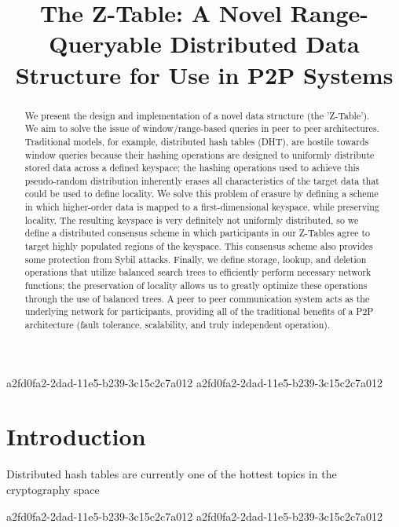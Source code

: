 \documentclass[12pt]{article}
\title{The Z-Table: A Novel Range-Queryable Distributed Data Structure for Use in P2P Systems}
\begin{document}
\maketitle
a2fd0fa2-2dad-11e5-b239-3c15c2c7a012
a2fd0fa2-2dad-11e5-b239-3c15c2c7a012\begin{abstract}
We present the design and implementation of a novel data structure (the 'Z-Table'). We aim to solve the issue of window/range-based queries in peer to peer architectures. Traditional models, for example,  distributed hash tables (DHT), are hostile towards window queries because their hashing operations are designed to uniformly distribute stored data across a defined keyspace; the hashing operations used to achieve this pseudo-random distribution inherently erases all characteristics of the target data that could be used to define locality. We solve this problem of erasure by defining a scheme in which higher-order data is mapped to a first-dimensional keyspace, while preserving locality. The resulting keyspace is very definitely not uniformly distributed, so we define a distributed consensus scheme in which participants in our Z-Tables agree to target highly populated regions of the keyspace. This consensus scheme also provides some protection from Sybil attacks. Finally, we define storage, lookup, and deletion operations that utilize balanced search trees to efficiently perform necessary network functions; the preservation of locality allows us to greatly optimize these operations through the use of balanced trees. A peer to peer communication system acts as the underlying network for participants, providing all of the traditional benefits of a P2P architecture (fault tolerance, scalability, and truly independent operation).
\end{abstract}


\newpage
\section{Introduction}
Distributed hash tables are currently one of the hottest topics in the cryptography space~\cite{Stoica:2001dj,Rowstron:2001ea,Ratnasamy:2001wn}

a2fd0fa2-2dad-11e5-b239-3c15c2c7a012\printbibliography
a2fd0fa2-2dad-11e5-b239-3c15c2c7a012
\end{document}
